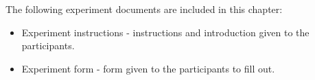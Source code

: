 The following experiment documents are included in this chapter:
\begin{itemize}

  \item Experiment instructions - instructions and introduction given to the
  participants.

  \item Experiment form - form given to the participants to fill out.

\end{itemize}






